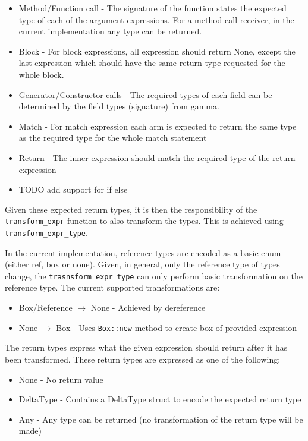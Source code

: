 \documentclass[ oneside,%
                    author={James Elgar},
                    degree={MEng},
                     title={Bidirectional transformer between functional and \\ object-oriented programming in Rust},
                  subtitle={}]{dissertation}
\newcommand{\rust}[1]{\texttt{#1}}
\begin{document}
\begin{itemize}
    \item Method/Function call - The signature of the function states the expected type of each of the argument expressions. For a method call receiver, in the current implementation any type can be returned. %
    \item Block - For block expressions, all expression should return None, except the last expression which should have the same return type requested for the whole block.
    \item Generator/Constructor calls - The required types of each field can be determined by the field types (signature) from gamma.
    \item Match - For match expression each arm is expected to return the same type as the required type for the whole match statement
    \item Return - The inner expression should match the required type of the return expression
    \item TODO add support for if else  
\end{itemize}

Given these expected return types, it is then the responsibility of the \verb|transform_expr| function to also transform the types. This is achieved using \verb|transform_expr_type|.  

In the current implementation, reference types are encoded as a basic enum (either ref, box or none). Given, in general, only the reference type of types change, the \verb|trasnsform_expr_type| can only perform basic transformation on the reference type. The current supported transformations are:

\begin{itemize}
    \item Box/Reference $\xrightarrow{}$ None - Achieved by dereference
    \item None $\xrightarrow{}$ Box - Uses \rust{Box::new} method to create box of provided expression
\end{itemize}

The return types express what the given expression should return after it has been transformed. These return types are expressed as one of the following:

\begin{itemize}
    \item None - No return value
    \item DeltaType - Contains a DeltaType struct to encode the expected return type
    \item Any - Any type can be returned (no transformation of the return type will be made)
\end{itemize}
\end{document}
